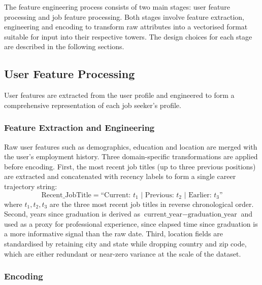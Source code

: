 The feature engineering process consists of two main stages: user feature 
processing and job feature processing. Both stages involve feature 
extraction, engineering and encoding to transform raw attributes 
into a vectorised format suitable for input into their respective 
towers. The design choices for each stage are described in the 
following sections.
\subsection{User Feature Processing}
\label{sec:user_features_processing}

User features are extracted from the user profile and engineered to form a comprehensive representation of each job seeker's profile.

\subsubsection{Feature Extraction and Engineering}

Raw user features such as demographics, education and location are 
merged with the user's employment history. Three domain-specific 
transformations are applied before encoding. First, the most recent 
job titles (up to three previous positions) are extracted and 
concatenated with recency labels to form a single career trajectory 
string:
\begin{equation}
\text{Recent\_JobTitle} = \text{``Current: } t_1 
\text{ | Previous: } t_2 \text{ | Earlier: } t_3\text{''}
\end{equation}
where $t_1, t_2, t_3$ are the three most recent job titles in reverse 
chronological order. Second, years since graduation is derived as 
$\text{current\_year} - \text{graduation\_year}$ and used as a proxy 
for professional experience, since elapsed time since graduation is a 
more informative signal than the raw date. Third, location fields are 
standardised by retaining city and state while dropping country and 
zip code, which are either redundant or near-zero variance at the 
scale of the dataset.

\subsubsection{Encoding}
\label{sec:user_embedding}

